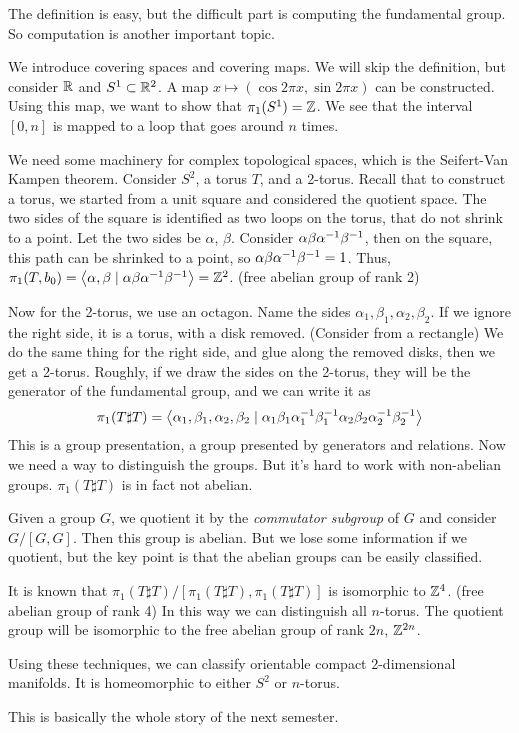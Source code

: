 The definition is easy, but the difficult part is computing the fundamental group. So computation is another important topic.

We introduce covering spaces and covering maps. We will skip the definition, but consider \(\mathbb{R}\) and \(S^1 \subset \mathbb{R}^2\). A map \(x \mapsto (\cos 2\pi x, \sin 2\pi x)\) can be constructed. Using this map, we want to show that \(\pi_1(S^1) = \mathbb{Z}\). We see that the interval \([0, n]\) is mapped to a loop that goes around \(n\) times.

We need some machinery for complex topological spaces, which is the Seifert-Van Kampen theorem. Consider \(S^2\), a torus \(T\), and a 2-torus. Recall that to construct a torus, we started from a unit square and considered the quotient space. The two sides of the square is identified as two loops on the torus, that do not shrink to a point. Let the two sides be \(\alpha\), \(\beta\). Consider \(\alpha\beta\alpha^{-1}\beta^{-1}\), then on the square, this path can be shrinked to a point, so \(\alpha\beta\alpha^{-1}\beta^{-1} = 1\). Thus, \(\pi_1(T, b_0) = \left\langle \alpha, \beta \mid \alpha\beta\alpha^{-1}\beta^{-1} \right\rangle = \mathbb{Z}^2\). (free abelian group of rank 2)

Now for the 2-torus, we use an octagon. Name the sides \(\alpha_1, \beta_1, \alpha_2, \beta_2\). If we ignore the right side, it is a torus, with a disk removed. (Consider from a rectangle) We do the same thing for the right side, and glue along the removed disks, then we get a 2-torus. Roughly, if we draw the sides on the 2-torus, they will be the generator of the fundamental group, and we can write it as
\[
    \pi_1(T\sharp T) = \left\langle \alpha_1, \beta_1, \alpha_2, \beta_2 \mid \alpha_1\beta_1\alpha_1^{-1}\beta_1^{-1}\alpha_2\beta_2\alpha_2^{-1}\beta_2^{-1} \right\rangle
\]
This is a group presentation, a group presented by generators and relations. Now we need a way to distinguish the groups. But it's hard to work with non-abelian groups. \(\pi_1(T\sharp T)\) is in fact not abelian.

Given a group \(G\), we quotient it by the \textit{commutator subgroup} of \(G\) and consider \(G/[G, G]\). Then this group is abelian. But we lose some information if we quotient, but the key point is that the abelian groups can be easily classified.

It is known that \(\pi_1(T\sharp T) / [\pi_1(T\sharp T), \pi_1(T\sharp T)]\) is isomorphic to \(\mathbb{Z}^4\). (free abelian group of rank 4) In this way we can distinguish all \(n\)-torus. The quotient group will be isomorphic to the free abelian group of rank \(2n\), \(\mathbb{Z}^{2n}\).

Using these techniques, we can classify orientable compact \(2\)-dimensional manifolds. It is homeomorphic to either \(S^2\) or \(n\)-torus.

This is basically the whole story of the next semester.

\pagebreak
